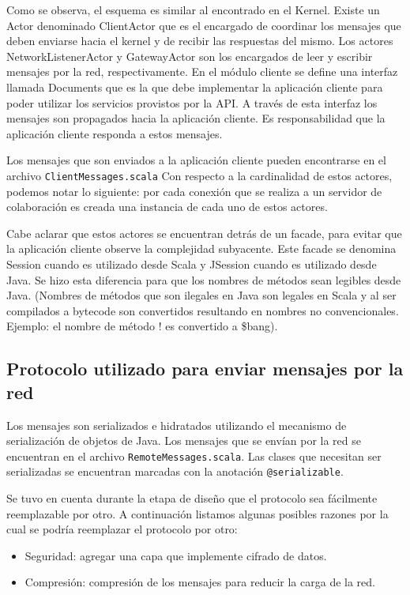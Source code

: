 \documentclass[12pt,a4paper]{article}
\begin{document}
Como se observa, el esquema es similar al encontrado en el Kernel. Existe un Actor denominado ClientActor que es el
encargado de coordinar los mensajes que deben enviarse hacia el kernel y de recibir las respuestas del mismo.
Los actores NetworkListenerActor y GatewayActor son los encargados de leer y escribir mensajes por la red, respectivamente.
En el módulo cliente se define una interfaz llamada Documents que es la que debe implementar la aplicación cliente para poder
utilizar los servicios provistos por la API.
A través de esta interfaz los mensajes son propagados hacia la aplicación cliente. Es responsabilidad que la aplicación cliente
responda a estos mensajes.

Los mensajes que son enviados a la aplicación cliente pueden encontrarse en el archivo 
\texttt{ClientMessages.scala}
Con respecto a la cardinalidad de estos actores, podemos notar lo siguiente:
por cada conexión que se realiza a un servidor de colaboración es creada una instancia de cada uno de estos actores.

Cabe aclarar que estos actores se encuentran detrás de un facade, para evitar que la aplicación cliente observe la
complejidad subyacente. Este facade se denomina Session cuando es utilizado desde Scala y JSession cuando es utilizado desde Java.
Se hizo esta diferencia para que los nombres de métodos sean legibles desde Java. (Nombres de métodos que son ilegales en Java son
legales en Scala y al ser compilados a bytecode son convertidos resultando en nombres no convencionales. Ejemplo: el nombre de 
método ! es convertido a \$bang).


\subsection{Protocolo utilizado para enviar mensajes por la red}
Los mensajes son serializados e hidratados utilizando el mecanismo de serialización de objetos de Java. Los mensajes que se
envían por la red se encuentran en el archivo
\texttt{RemoteMessages.scala}.
Las clases que necesitan ser serializadas se encuentran marcadas con la anotación \texttt{@serializable}.

Se tuvo en cuenta durante la etapa de diseño que el protocolo sea fácilmente reemplazable por otro. A continuación listamos
algunas posibles razones por la cual se podría reemplazar el protocolo por otro:

\begin{itemize}
	\item Seguridad: agregar una capa que implemente cifrado de datos.
	\item Compresión: compresión de los mensajes para reducir la carga de la red.
\end{itemize}
\end{document}
